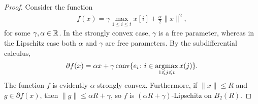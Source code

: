 \begin{proof}
Consider the function
\begin{align}
    f(x) = \gamma \max_{1 \leq i \leq t} x[i] + \frac{\alpha}{2} \|x\|^2,
\end{align}
for some $\gamma, \alpha \in \mathbb{R}$. In the strongly convex case, $\gamma$ is
a free parameter, whereas in the Lipschitz case both $\alpha$ and $\gamma$ are
free parameters. By the subdifferential calculus,
\begin{align}
    \partial f(x) 
        = \alpha x + \gamma \mathop{\rm conv}\{e_i \colon i \in \mathop{\rm argmax}_{1 \leqslant j \leqslant t} x(j)\}.
\end{align}
The function $f$ is evidently $\alpha$-strongly convex. Furthermore, if $\|x\| \leq R$
and $g \in \partial f(x)$, then $\|g\| \leq \alpha R + \gamma$, so $f$ is
$(\alpha R + \gamma)$-Lipschitz on $B_2(R)$.


\end{proof}
